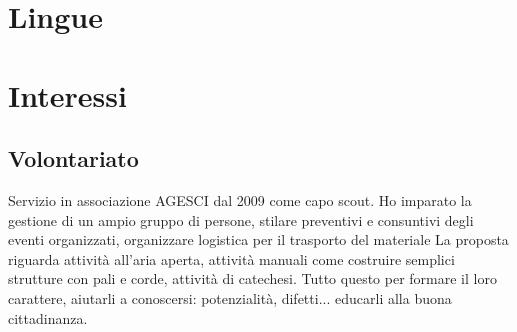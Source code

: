 \documentclass[12pt,a4paper,sans]{moderncv} %
\begin{document}



%

	
\section{Lingue}


\section{Interessi}
\subsection{Volontariato}
Servizio in associazione AGESCI dal 2009 come capo scout. Ho imparato la gestione di un ampio gruppo di persone, stilare preventivi e consuntivi degli eventi organizzati, organizzare logistica per il trasporto del materiale
La proposta riguarda attività all'aria aperta, attività manuali come costruire semplici strutture con pali e corde, attività di catechesi. Tutto questo per formare il loro carattere, aiutarli a conoscersi: potenzialità, difetti... educarli alla buona cittadinanza.
\end{document}

